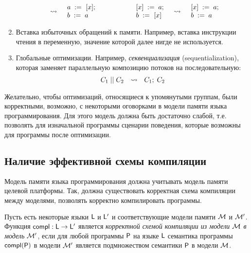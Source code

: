 \begin{enumerate}
\[\begin{array}{c c c}
\begin{array}{l c l}
\begin{array}{l}
        \end{array}
        & \rightsquigarrow &
        \begin{array}{l}
        a \;:=_{}\;[x]; \\
        b\;:=\;a
        \end{array}
      \end{array}
      & \qquad &
      \begin{array}{l c l}
        \begin{array}{l}
        [x]\;:=\;a; \\
        b \;:=_{}\;[x]
        \end{array}
        & \rightsquigarrow &
        \begin{array}{l}
        [x]\;:=\;a; \\
        b\;:=\;a
        \end{array}
      \end{array}
    \end{array}
    \]
  \item Вставка избыточных обращений к памяти. Например, вставка инструкции чтения в переменную,
    значение которой далее нигде не используется.
  \item Глобальные оптимизации. Например, \emph{секвенциализация} (sequentialization),
    которая заменяет параллельную композицию потоков на последовательную:
    \[
      \begin{array}{l c l}
      C_1\;||\;C_2 & \rightsquigarrow & C_1;\;C_2
      \end{array}
    \]
\end{enumerate}

Желательно, чтобы оптимизаций, относящиеся к упомянутыми группам, были корректными, возможно, с некоторыми оговорками
в модели памяти языка программирования.
Для этого модель должна быть достаточно слабой, т.е. позволять для изначальной программы сценарии поведения, которые
возможны для программы после оптимизации.

\subsection{Наличие эффективной схемы компиляции}
Модель памяти языка программирования должна учитывать модель памяти целевой платформы.
Так, должна существовать корректная схема компиляции между моделями, позволять корректно компилировать программы.

\begin{definition}
Пусть есть некоторые языки $\mathsf{L}$ и $\mathsf{L'}$ и соответствующие модели памяти $\mathcal{M}$ и $\mathcal{M'}$.
Функция $\mathsf{compl} : \mathsf{L} \rightarrow \mathsf{L'}$ является \emph{корректной схемой компиляции из модели $\mathcal{M}$ в модель $\mathcal{M'}$},
если для любой программы $\mathsf{P}$ на языке $\mathsf{L}$ семантика программы $\mathsf{compl}(\mathsf{P})$ в модели $\mathcal{M'}$ является подмножеством
семантики $\mathsf{P}$ в модели $\mathcal{M}$.
\end{definition}


